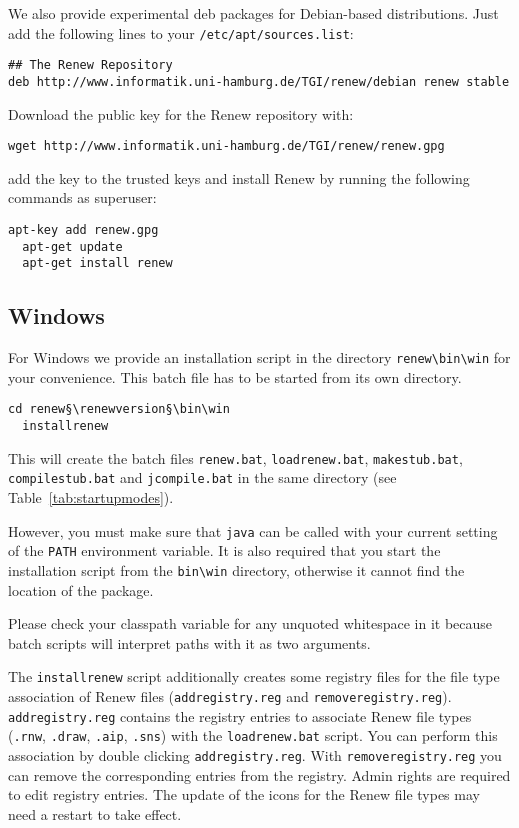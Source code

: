 We also provide experimental deb packages for Debian-based
distributions. Just add the following lines to your
\texttt{/etc/apt/sources.list}:
\begin{lstlisting}[style=xnonfloating]
## The Renew Repository
deb http://www.informatik.uni-hamburg.de/TGI/renew/debian renew stable
\end{lstlisting}
  
Download the public key for the Renew repository with:
\begin{lstlisting}[style=xnonfloating]
  wget http://www.informatik.uni-hamburg.de/TGI/renew/renew.gpg
\end{lstlisting}
  
add the key to the trusted keys and install Renew by running the following commands as superuser:
\begin{lstlisting}[style=xnonfloating]
  apt-key add renew.gpg
  apt-get update
  apt-get install renew
\end{lstlisting}


\subsection{Windows}

For Windows we provide an installation script
in the directory \texttt{renew\renewversion}\verb|\bin\win|
for your convenience.
This batch file has to be started from its own directory.
\begin{lstlisting}[style=xnonfloating]
  cd renew§\renewversion§\bin\win
  installrenew
\end{lstlisting}
This will create the batch files \texttt{renew.bat},
\texttt{loadrenew.bat}, \texttt{makestub.bat},
\texttt{compilestub.bat} and \texttt{jcompile.bat}
in the same directory (see Table~\ref{tab:startupmodes}).

However, you must make sure that \texttt{java} can be
called with your current setting of the \texttt{PATH}
environment variable. It is also required that you start
the installation script from the \verb|bin\win| directory,
otherwise it cannot find the location of the package.

Please check your classpath variable for any unquoted whitespace 
in it because batch scripts will interpret paths with it as two 
arguments.

The \texttt{installrenew} script additionally creates some registry files for the file type association of Renew files (\texttt{addregistry.reg} and 
\texttt{removeregistry.reg}).
\texttt{addregistry.reg} contains the registry entries to associate
Renew file types (\texttt{.rnw}, \texttt{.draw}, \texttt{.aip}, \texttt{.sns}) with the \texttt{loadrenew.bat} script.
You can perform this association by double clicking \texttt{addregistry.reg}.
With \texttt{removeregistry.reg} you can remove the corresponding entries from the 
registry.  Admin rights are required to edit registry 
entries. The update of the icons for the Renew file types may need a restart to take effect.


